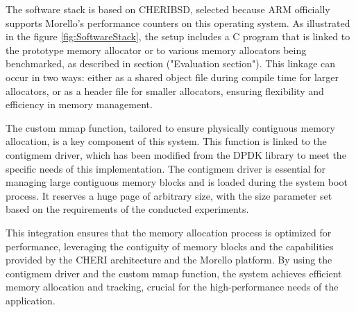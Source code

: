 The software stack is based on CHERIBSD\cite{noauthor_getting_nodate}, selected because ARM officially supports Morello's performance 
counters\cite{noauthor_arm_nodate} on this operating system. As illustrated in the figure \ref{fig:SoftwareStack}, the setup includes a C program that 
is linked to the prototype memory allocator or to various memory allocators being benchmarked, as described 
in section ("Evaluation section"). This linkage can occur in two ways: either as a shared object file during compile time 
for larger allocators, or as a header file for smaller allocators, ensuring flexibility and efficiency 
in memory management.

The custom mmap function, tailored to ensure physically contiguous memory allocation, is a key component 
of this system. This function is linked to the contigmem driver, which has been modified from the DPDK\cite{bi_dpdk-based_2016} library 
to meet the specific needs of this implementation. The contigmem driver is essential for managing large contiguous 
memory blocks and is loaded during the system boot process. It reserves a huge page of arbitrary size, with the 
size parameter set based on the requirements of the conducted experiments.

This integration ensures that the memory allocation process is optimized for performance, leveraging the contiguity 
of memory blocks and the capabilities provided by the CHERI architecture and the Morello platform. By using the 
contigmem driver and the custom mmap function, the system achieves efficient memory allocation and tracking, 
crucial for the high-performance needs of the application.